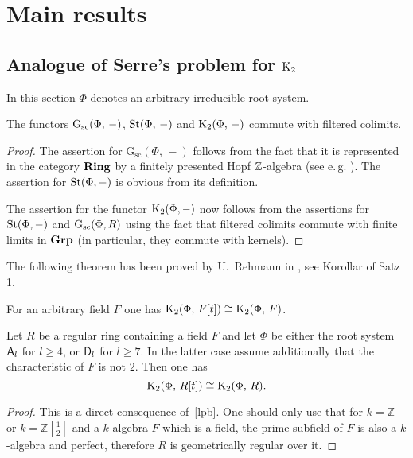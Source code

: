 \documentclass[oneside, 11pt]{amsart} \pdfoutput=1
\begin{document}
\section{Main results}\label{sec:main}
\subsection{Analogue of Serre's problem for \texorpdfstring{${\mathrm{K}}_2$}{K2}}

In this section $\Phi$ denotes an arbitrary irreducible root system.

\begin{lemma}
\label{k2cdc} 
The functors $\mathrm{G}_\mathrm{sc}(\Phi,\,-)$, $\mathop{\mathrm{St}}\nolimits(\Phi,\,-)$ and ${\mathrm{K}}_2(\Phi,\,-)$ commute with filtered colimits.
\end{lemma}
\begin{proof}
The assertion for $\mathrm G_{\mathrm{sc}}(\Phi,\,-)$ follows from the fact that it is represented in the category ${\normalfont\textbf{Ring}}$ by a finitely presented Hopf $\mathbb{Z}$-algebra (see e.\,g. \cite[Lemma~10.127.3]{stacks-project}). The assertion for $\mathop{\mathrm{St}}\nolimits(\Phi, -)$ is obvious from its definition. 

The assertion for the functor ${\mathrm{K}}_2(\Phi, -)$ now follows from the assertions for $\mathop{\mathrm{St}}\nolimits(\Phi, -)$ and $\mathrm{G}_\mathrm{sc}(\Phi, R)$ using the fact that filtered colimits commute with finite limits in ${\normalfont\textbf{Grp}}$ (in particular, they commute with kernels).
\end{proof}

The following theorem has been proved by U.~Rehmann in \cite{Re75}, see Korollar of Satz 1.

\begin{theorem}
For an arbitrary field $F$ one has ${\mathrm{K}}_2(\Phi,\,F[t])\cong{\mathrm{K}}_2(\Phi,\,F)$.
\end{theorem}

\begin{theorem} \label{theorem:LP-for-K2}
Let $R$ be a regular ring containing a field $F$ and let $\Phi$ be either the root system $\mathsf{A}_l$  for $l\geq4$, or $\mathsf{D}_l$ for $l\geq7$. In the latter case assume additionally that the characteristic of $F$ is not $2$. Then one has
\[{\mathrm{K}}_2(\Phi,\,R[t])\cong{\mathrm{K}}_2(\Phi,\,R).\]
\end{theorem}
\begin{proof}
This is a direct consequence of~\ref{lpb}. One should only use that for $k=\mathbb Z$ or $k=\mathbb Z[\frac12]$ and a $k$-algebra $F$ which is a field, the prime subfield of $F$ is also a $k$-algebra and perfect, therefore $R$ is geometrically regular over it.
\end{proof}
\end{document}
